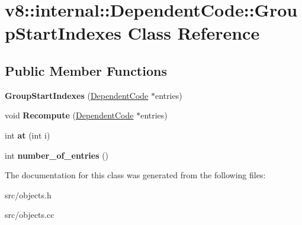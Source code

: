 \hypertarget{classv8_1_1internal_1_1_dependent_code_1_1_group_start_indexes}{}\section{v8\+:\+:internal\+:\+:Dependent\+Code\+:\+:Group\+Start\+Indexes Class Reference}
\label{classv8_1_1internal_1_1_dependent_code_1_1_group_start_indexes}
\subsection*{Public Member Functions}
\begin{DoxyCompactItemize}
\item 
\hypertarget{classv8_1_1internal_1_1_dependent_code_1_1_group_start_indexes_aed7d79eb113b9017d00dfab55aff4b2b}{}{\bfseries Group\+Start\+Indexes} (\hyperlink{classv8_1_1internal_1_1_dependent_code}{Dependent\+Code} $\ast$entries)\label{classv8_1_1internal_1_1_dependent_code_1_1_group_start_indexes_aed7d79eb113b9017d00dfab55aff4b2b}

\item 
\hypertarget{classv8_1_1internal_1_1_dependent_code_1_1_group_start_indexes_a21fce13b937cfeb5aad0db1186c7e86d}{}void {\bfseries Recompute} (\hyperlink{classv8_1_1internal_1_1_dependent_code}{Dependent\+Code} $\ast$entries)\label{classv8_1_1internal_1_1_dependent_code_1_1_group_start_indexes_a21fce13b937cfeb5aad0db1186c7e86d}

\item 
\hypertarget{classv8_1_1internal_1_1_dependent_code_1_1_group_start_indexes_ab8aac85a4732d75fefe86cf859795022}{}int {\bfseries at} (int i)\label{classv8_1_1internal_1_1_dependent_code_1_1_group_start_indexes_ab8aac85a4732d75fefe86cf859795022}

\item 
\hypertarget{classv8_1_1internal_1_1_dependent_code_1_1_group_start_indexes_a48d7ca1101c100d9f8be2fcc41a28150}{}int {\bfseries number\+\_\+of\+\_\+entries} ()\label{classv8_1_1internal_1_1_dependent_code_1_1_group_start_indexes_a48d7ca1101c100d9f8be2fcc41a28150}

\end{DoxyCompactItemize}


The documentation for this class was generated from the following files\+:\begin{DoxyCompactItemize}
\item 
src/objects.\+h\item 
src/objects.\+cc\end{DoxyCompactItemize}
